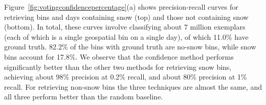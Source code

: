 






Figure~\ref{fig:votingconfidencepercentage}(a) shows precision-recall
curves for retrieving bins and days containing snow (top) and those
not containing snow (bottom).  In total, these curves involve
classifying about 7 million exemplars (each of which is a single geospatial
bin on a single day), of which 11.0\% have ground truth. 82.2\% of
the bins with ground truth are no-snow bins, while snow bins account
for 17.8\%.
We observe that the confidence method performs significantly better than the other two methods for retrieving snow bins, 
achieving about 98\% precision at 0.2\% recall, and about 80\% precision at 1\% recall. 
For retrieving non-snow bins the three techniques are almost the same, and all three perform better than the random baseline.

